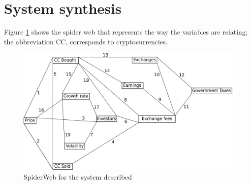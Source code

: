 
\section{System synthesis}
Figure \ref{img-web} shows the spider web that represents the way the variables are relating; the abbreviation CC, corresponds to cryptocurrencies. 

\begin{figure}[H]
	\centering
    \includegraphics[scale=0.5]{files/SpiderWeb.pdf}
    \caption{SpiderWeb for the system described}
    \label{img-web}
\end{figure}

